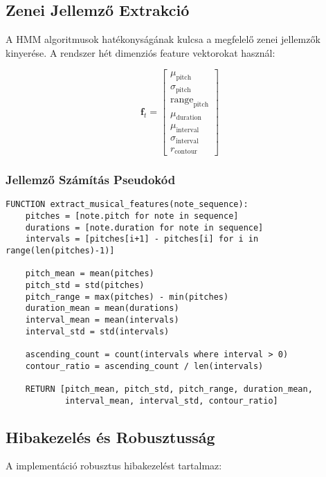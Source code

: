 \subsection{Zenei Jellemző Extrakció}

A HMM algoritmusok hatékonyságának kulcsa a megfelelő zenei jellemzők kinyerése. A rendszer hét dimenziós feature vektorokat használ:

\begin{equation}
\mathbf{f}_t = \begin{bmatrix}
\mu_{\text{pitch}} \\
\sigma_{\text{pitch}} \\
\text{range}_{\text{pitch}} \\
\mu_{\text{duration}} \\
\mu_{\text{interval}} \\
\sigma_{\text{interval}} \\
r_{\text{contour}}
\end{bmatrix}
\end{equation}

\subsubsection{Jellemző Számítás Pseudokód}

\begin{verbatim}
FUNCTION extract_musical_features(note_sequence):
    pitches = [note.pitch for note in sequence]
    durations = [note.duration for note in sequence]
    intervals = [pitches[i+1] - pitches[i] for i in range(len(pitches)-1)]
    
    pitch_mean = mean(pitches)
    pitch_std = std(pitches)
    pitch_range = max(pitches) - min(pitches)
    duration_mean = mean(durations)
    interval_mean = mean(intervals)
    interval_std = std(intervals)
    
    ascending_count = count(intervals where interval > 0)
    contour_ratio = ascending_count / len(intervals)
    
    RETURN [pitch_mean, pitch_std, pitch_range, duration_mean, 
            interval_mean, interval_std, contour_ratio]
\end{verbatim}

\subsection{Hibakezelés és Robusztusság}

A implementáció robusztus hibakezelést tartalmaz:

